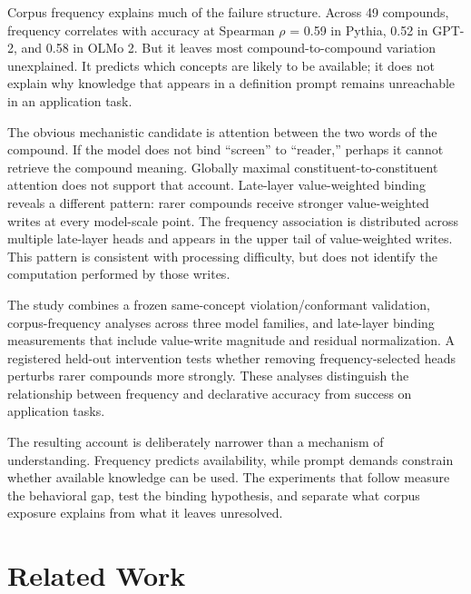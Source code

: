\documentclass[
  english,
]{article}
\begin{document}
Corpus frequency explains much of the failure structure. Across 49 compounds, frequency correlates with accuracy at Spearman \(\rho\) = 0.59 in Pythia, 0.52 in GPT-2, and 0.58 in OLMo 2. But it leaves most compound-to-compound variation unexplained. It predicts which concepts are likely to be available; it does not explain why knowledge that appears in a definition prompt remains unreachable in an application task.

The obvious mechanistic candidate is attention between the two words of the compound. If the model does not bind ``screen'' to ``reader,'' perhaps it cannot retrieve the compound meaning. Globally maximal constituent-to-constituent attention does not support that account. Late-layer value-weighted binding reveals a different pattern: rarer compounds receive stronger value-weighted writes at every model-scale point. The frequency association is distributed across multiple late-layer heads and appears in the upper tail of value-weighted writes. This pattern is consistent with processing difficulty, but does not identify the computation performed by those writes.

The study combines a frozen same-concept violation/conformant validation, corpus-frequency analyses across three model families, and late-layer binding measurements that include value-write magnitude and residual normalization. A registered held-out intervention tests whether removing frequency-selected heads perturbs rarer compounds more strongly. These analyses distinguish the relationship between frequency and declarative accuracy from success on application tasks.

The resulting account is deliberately narrower than a mechanism of understanding. Frequency predicts availability, while prompt demands constrain whether available knowledge can be used. The experiments that follow measure the behavioral gap, test the binding hypothesis, and separate what corpus exposure explains from what it leaves unresolved.

\section{Related Work}\label{related-work}
\end{document}
